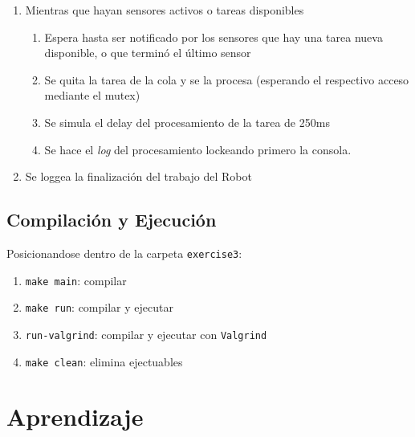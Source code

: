 \documentclass[11pt, a4paper]{article}
\begin{document}
\begin{multicols}{2}
\begin{enumerate}[label=\Roman*.]
    \item Mientras que hayan sensores activos o tareas disponibles
    \begin{enumerate}[label=\roman*.]
        \item Espera hasta ser notificado por los sensores que hay una tarea nueva disponible,
        o que terminó el último sensor
        \item Se quita la tarea de la cola y se la procesa (esperando el respectivo acceso mediante
        el mutex)
        \item Se simula el delay del procesamiento de la tarea de 250ms
        \item Se hace el \textit{log} del procesamiento lockeando primero la consola.
    \end{enumerate}
    \item Se loggea la finalización del trabajo del Robot
\end{enumerate}

\subsection{Compilación y Ejecución}

Posicionandose dentro de la carpeta \lstinline|exercise3|:

\begin{enumerate}[label=\roman*.]
    \item \lstinline|make main|: compilar
    \item \lstinline|make run|: compilar y ejecutar
    \item \lstinline|run-valgrind|: compilar y ejecutar con \lstinline|Valgrind|
    \item \lstinline|make clean|: elimina ejectuables
\end{enumerate}
\section*{Aprendizaje}


\end{multicols}
\end{document}
